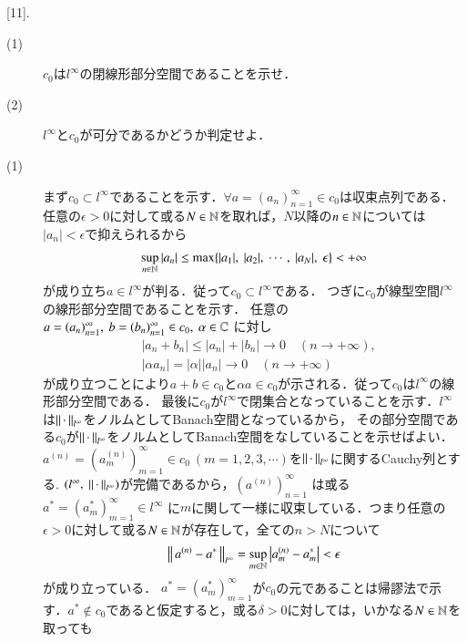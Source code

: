 [11].\ 
	\begin{description}
		\item[(1)] $c_0$は$l^{\infty}$の閉線形部分空間であることを示せ．
		\item[(2)] $l^{\infty}$と$c_0$が可分であるかどうか判定せよ．
	\end{description}
	
\begin{prf}\mbox{}
\begin{description}
	\item[(1)] まず$c_0 \subset l^{\infty}$であることを示す．$\forall a=(a_n)_{n=1}^{\infty} \in c_0$は収束点列である．
		任意の$\epsilon > 0$に対して或る$N \in \mathbb{N}$を取れば，$N$以降の$n \in \mathbb{N}$については$|a_n| < \epsilon$で抑えられるから
		\begin{align}
			\sup{n \in \N}{|a_n|} \leq \max{}{\{|a_1|,\ |a_2|,\ \cdots,\ |a_N|,\ \epsilon\}} < +\infty
		\end{align}
		が成り立ち$a \in l^{\infty}$が判る．従って$c_0 \subset l^{\infty}$である．
		つぎに$c_0$が線型空間$l^{\infty}$の線形部分空間であることを示す．
		任意の$a=(a_n)_{n=1}^{\infty},\ b=(b_n)_{n=1}^{\infty} \in c_0,\ \alpha \in \C$
		に対し
		\begin{align}
			&|a_n + b_n| \leq |a_n| + |b_n| \longrightarrow 0 \quad (n \longrightarrow +\infty), \\
			&|\alpha a_n|= |\alpha||a_n| \longrightarrow 0 \quad (n \longrightarrow +\infty)
		\end{align}
		が成り立つことにより$a + b \in c_0$と$\alpha a \in c_0$が示される．従って$c_0$は$l^{\infty}$の線形部分空間である．
		最後に$c_0$が$l^{\infty}$で閉集合となっていることを示す．$l^{\infty}$は$\left\|\, \cdot\, \right\|_{l^{\infty}}$をノルムとしてBanach空間となっているから，
		その部分空間である$c_0$が$\left\|\, \cdot\, \right\|_{l^{\infty}}$をノルムとしてBanach空間をなしていることを示せばよい．
		$a^{(n)} = \left(a_m^{(n)}\right)_{m=1}^{\infty} \in c_0\ (m=1,2,3,\cdots)$を$\left\|\, \cdot\, \right\|_{l^{\infty}}$に関するCauchy列とする. 
		$(l^{\infty},\ \Norm{\cdot}{l^{\infty}})$が完備であるから，$\left(a^{(n)}\right)_{n=1}^{\infty}$
		は或る$a^{*} = \left(a_m^{*}\right)_{m=1}^{\infty} \in l^{\infty}$
		に$m$に関して一様に収束している．つまり任意の$\epsilon > 0$に対して或る$N \in \mathbb{N}$が存在して，全ての$n > N$について
		\begin{align}
			\left\|\, a^{(n)} - a^{*}\, \right\|_{l^{\infty}} = \operatorname*{sup}_{m \in \mathbb{N}} \left|a_m^{(n)} - a_m^{*}\right| < \epsilon \label{eq:func_analy_Q11}
		\end{align}
		が成り立っている．
		$a^{*} = (a_m^{*})_{m=1}^{\infty}$が$c_0$の元であることは帰謬法で示す．$a^* \notin c_0$であると仮定すると，或る$\delta > 0$に対しては，いかなる$N \in \mathbb{N}$を取っても

\end{description}
\end{prf}
